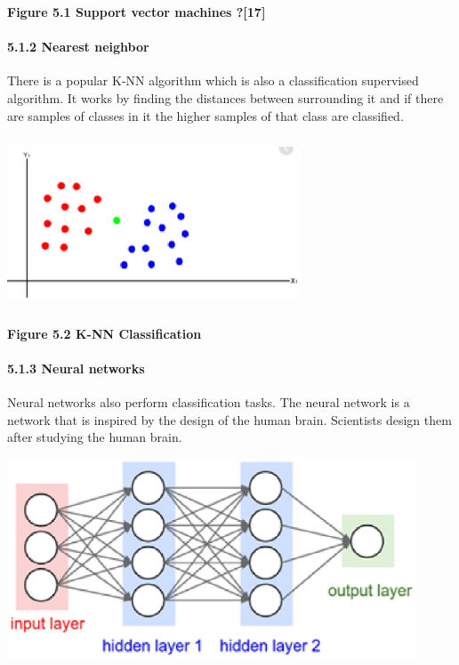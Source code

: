 \documentclass{article} %
\begin{document}
\noindent \textbf{Figure 5.1 Support vector machines ?[17]}

\noindent 

\noindent 
\paragraph{5.1.2 Nearest neighbor}

\noindent There is a popular K-NN algorithm which is also a classification supervised algorithm. It works by finding the distances between surrounding it and if there are samples of classes in it the higher samples of that class are classified.

\noindent 

\noindent 

\noindent \includegraphics*[width=3.43in, height=2.01in, keepaspectratio=false, trim=0.29in 0.24in 0.71in 0.17in]{image21}

\noindent \textbf{Figure 5.2 K-NN Classification}

\noindent 
\paragraph{5.1.3 Neural networks}

\noindent Neural networks also perform classification tasks. The neural network is a network that is inspired by the design of the human brain. Scientists design them after studying the human brain.

\noindent \includegraphics*[width=4.78in, height=2.34in, keepaspectratio=false]{image22}\textbf{}
\end{document}
